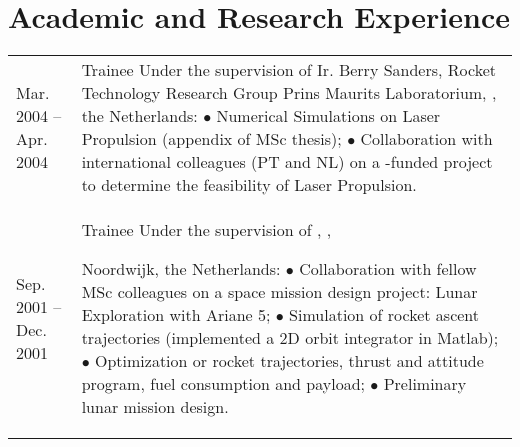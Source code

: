 \documentclass[a4paper]{article}
\newcommand{\dynhref}[2]{%
  \iftoggle{expliciturl}{%
    #2 (\href{#1}{\texttt{\detokenize{#1}}})%
  }{%
    \href{#1}{#2}%
  }%
}
\newlength{\listskipbig}
\newenvironment{cvsection}[2]{
  \setlength{\floatsep}{0pt}
  \setlength{\textfloatsep}{0pt}
  \setlength{\intextsep}{0pt}
  \section*{#1}
  \begin{longtable}{lp{#2}}
}{
  \end{longtable}
}
\begin{document}
\begin{cvsection}{Academic and Research Experience}{10.8cm}
Mar. 2004 -- Apr. 2004
  & Trainee\newline
    Under the supervision of Ir. Berry Sanders, Rocket Technology Research Group
    Prins Maurits Laboratorium, \dynhref{http://www.tno.nl/}{TNO}, the Netherlands:\newline
      $\bullet$ Numerical Simulations on Laser Propulsion (appendix of MSc thesis);\newline
      $\bullet$ Collaboration with international colleagues (PT and NL) on a \dynhref{http://www.esa.int}{ESA}-funded project to determine the feasibility of Laser Propulsion.
    \\[\listskipbig]

Sep. 2001 -- Dec. 2001
  & Trainee\newline
    Under the supervision of \dynhref{https://en.wikipedia.org/wiki/Wubbo_Ockels}{Prof Wubbo Ockels},
    \dynhref{http://www.esa.int/About_Us/ESTEC}{European Space research and Technology Center (ESTEC)}, \dynhref{http://www.esa.int}{ESA}
    Noordwijk, the Netherlands:\newline
      $\bullet$ Collaboration with fellow MSc colleagues on a space mission design project: Lunar Exploration with Ariane 5;\newline
      $\bullet$ Simulation of rocket ascent trajectories (implemented a 2D orbit integrator in Matlab);\newline
      $\bullet$ Optimization or rocket trajectories, thrust and attitude program, fuel consumption and payload;\newline
      $\bullet$ Preliminary lunar mission design.
    \\[\listskipbig]

\end{cvsection}


\end{document}

